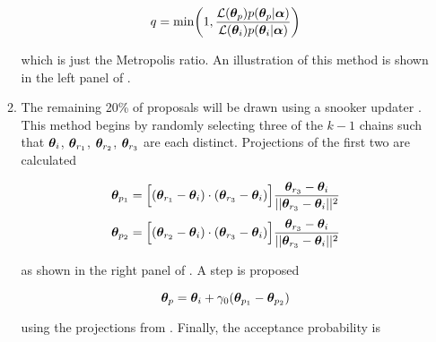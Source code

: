 \begin{enumerate}
\begin{enumerate}
\begin{equation}
q = \mathrm{min} \bigg( 1, \frac{\mathcal{L}(\boldsymbol{\theta}_p) p(\boldsymbol{\theta}_p|\boldsymbol{\alpha})}
{\mathcal{L}(\boldsymbol{\theta}_i) p(\boldsymbol{\theta}_i|\boldsymbol{\alpha})} \bigg)
\label{eq:elifetime_fit_mcmc_acc_demc}
\end{equation}

\noindent which is just the Metropolis ratio.  An illustration of this method is shown in the left panel of
.

\item \label{itm:update_demc_snooker} The remaining 20\% of proposals will be drawn using a snooker updater
.  This method begins by randomly selecting three of the
$k - 1$ chains such that $\boldsymbol{\theta}_i$, $\boldsymbol{\theta}_{r_1}$,
$\boldsymbol{\theta}_{r_2}$, $\boldsymbol{\theta}_{r_3}$ are each distinct.  Projections of the first two are calculated

\vspace{-35pt}

\begin{subequations}
\begin{align}
\boldsymbol{\theta}_{p_1} = \Big[ (\boldsymbol{\theta}_{r_1} - \boldsymbol{\theta}_i) \cdot
(\boldsymbol{\theta}_{r_3} - \boldsymbol{\theta}_i) \Big]
\frac{\boldsymbol{\theta}_{r_3} - \boldsymbol{\theta}_i}{||\boldsymbol{\theta}_{r_3} - \boldsymbol{\theta}_i||^2}
\label{eq:elifetime_fit_mcmc_de_snooker_proj1}
\\[3pt]
\boldsymbol{\theta}_{p_2} = \Big[ (\boldsymbol{\theta}_{r_2} - \boldsymbol{\theta}_i) \cdot
(\boldsymbol{\theta}_{r_3} - \boldsymbol{\theta}_i) \Big]
\frac{\boldsymbol{\theta}_{r_3} - \boldsymbol{\theta}_i}{||\boldsymbol{\theta}_{r_3} - \boldsymbol{\theta}_i||^2}
\label{eq:elifetime_fit_mcmc_de_snooker_proj2}
\end{align}
\label{eq:elifetime_fit_mcmc_de_snooker_projs}
\end{subequations}

\vspace{-25pt}

\noindent as shown in the right panel of .  A step is proposed

\vspace{-10pt}

\begin{equation}
\boldsymbol{\theta}_p = \boldsymbol{\theta}_i + \gamma_0 (\boldsymbol{\theta}_{p_1} - \boldsymbol{\theta}_{p_2})
\label{eq:elifetime_fit_mcmc_update_snooker}
\end{equation}

\noindent using the projections from .  Finally, the acceptance probability is


\end{enumerate}
\end{enumerate}
